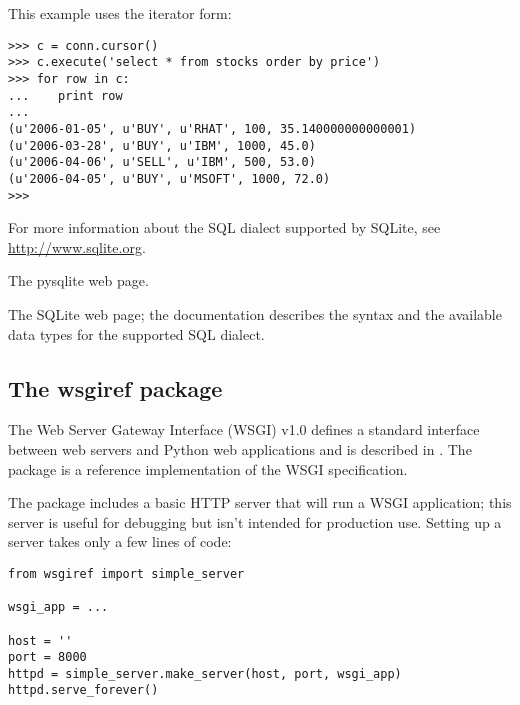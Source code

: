 \documentclass{howto}
\begin{document}
This example uses the iterator form:

\begin{verbatim}
>>> c = conn.cursor()
>>> c.execute('select * from stocks order by price')
>>> for row in c:
...    print row
...
(u'2006-01-05', u'BUY', u'RHAT', 100, 35.140000000000001)
(u'2006-03-28', u'BUY', u'IBM', 1000, 45.0)
(u'2006-04-06', u'SELL', u'IBM', 500, 53.0)
(u'2006-04-05', u'BUY', u'MSOFT', 1000, 72.0)
>>>
\end{verbatim}

For more information about the SQL dialect supported by SQLite, see 
\url{http://www.sqlite.org}.

\begin{seealso}

{The pysqlite web page.}

{The SQLite web page; the documentation describes the syntax and the
available data types for the supported SQL dialect.}



\end{seealso}


\subsection{The wsgiref package\label{module-wsgiref}}


The Web Server Gateway Interface (WSGI) v1.0 defines a standard
interface between web servers and Python web applications and is
described in .  The  package is a reference
implementation of the WSGI specification.

The package includes a basic HTTP server that will run a WSGI
application; this server is useful for debugging but isn't intended for 
production use.  Setting up a server takes only a few lines of code:

\begin{verbatim}
from wsgiref import simple_server

wsgi_app = ...

host = ''
port = 8000
httpd = simple_server.make_server(host, port, wsgi_app)
httpd.serve_forever()
\end{verbatim}
\end{document}
